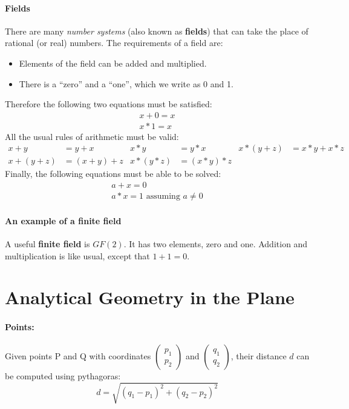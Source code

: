 \documentclass{article}
\begin{document}
\paragraph{Fields}
There are many \textit{number systems} (also known as \textbf{fields}) that can take the place of rational (or real) numbers. The requirements of a field are:
\begin{itemize}
\item Elements of the field can be added and multiplied.
\item There is a ``zero'' and a ``one'', which we write as 0 and 1.
\end{itemize}
Therefore the following two equations must be satisfied:
\begin{gather*}
x+0=x\\
x*1=x
\end{gather*}
All the usual rules of arithmetic must be valid:
\begin{align*}
x+y&=y+x & x*y&=y*x & x*(y+z)&=x*y+x*z\\
x+(y+z)&=(x+y)+z & x*(y*z)&=(x*y)*z
\end{align*}
Finally, the following equations must be able to be solved:
\begin{gather*}
a + x = 0\\
a*x=1 \text{ assuming } a\neq 0
\end{gather*}

\paragraph{An example of a finite field}
A useful \textbf{finite field} is $GF(2)$. It has two elements, zero and one. Addition and multiplication is like usual, except that $1+1=0$.

\section{Analytical Geometry in the Plane}

\paragraph{Points:}
Given points P and Q with coordinates
$\begin{pmatrix}p_1 \\ p_2\end{pmatrix}$
and
$\begin{pmatrix}q_1 \\ q_2\end{pmatrix}$,
their distance $d$ can be computed using pythagoras:
$$d = \sqrt{(q_1-p_1)^2+(q_2-p_2)^2}$$
\end{document}
